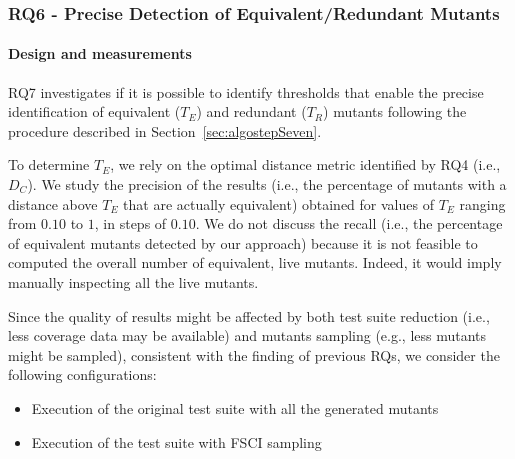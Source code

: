 





\subsubsection{RQ6 - Precise Detection of Equivalent/Redundant Mutants}

\paragraph{Design and measurements}

RQ7 investigates if it is possible to identify thresholds that enable the precise identification of equivalent ($T_E$) and redundant ($T_R$) mutants following the procedure described in Section~\ref{sec:algostepSeven}.

To determine $T_E$, 
we rely on the optimal distance metric identified by RQ4 (i.e., {$D_C$}).
We study the precision of the results (i.e., the percentage of mutants with a distance above $T_E$ that are actually equivalent) obtained for  values of $T_E$ ranging from $0.10$ to $1$, in steps of $0.10$.
{We do not discuss the recall (i.e., the percentage of equivalent mutants detected by our approach) because it is not feasible to computed the overall number of equivalent, live mutants. Indeed, it would imply manually inspecting all the live mutants.}

Since the quality of results might be affected by both test suite reduction (i.e., less coverage data may be available) and mutants sampling (e.g., less mutants might be sampled), consistent with the finding of previous RQs, we consider the following configurations: 
\begin{itemize}
\item Execution of the original test suite with all the generated mutants
\item Execution of the \APPR test suite with FSCI sampling
\end{itemize}

